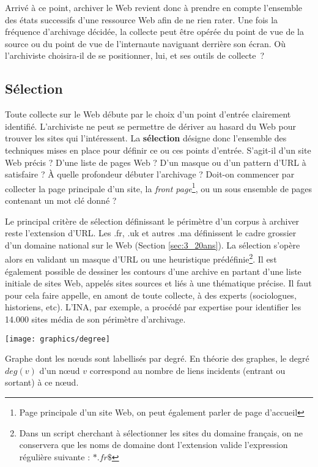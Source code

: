 \documentclass[symmetric,justified,marginals=raggedouter]{tufte-book}
\begin{document}
Arrivé à ce point, archiver le Web revient donc à prendre en compte l'ensemble des états successifs d'une ressource Web afin de ne rien rater. Une fois la fréquence d'archivage décidée, la collecte peut être opérée du point de vue de la source ou du point de vue de l'internaute naviguant derrière son écran. Où l'archiviste choisira-il de se positionner, lui, et ses outils de collecte~?

\subsection{Sélection}

\noindent Toute collecte sur le Web débute par le choix d'un point d'entrée clairement identifié. L'archiviste ne peut se permettre de dériver au hasard du Web pour trouver les sites qui l'intéressent. La \textbf{sélection} désigne donc l'ensemble des techniques mises en place pour définir ce ou ces points d'entrée. S'agit-il d'un site Web précis ? D'une liste de pages Web ? D'un masque ou d'un pattern d'URL à satisfaire ? À quelle profondeur débuter l'archivage ? Doit-on commencer par collecter la page principale d'un site, la \textit{front page}\footnote{Page principale d'un site Web, on peut également parler de page d'accueil}, ou un sous ensemble de pages contenant un mot clé donné ?     

Le principal critère de sélection définissant le périmètre d'un corpus à archiver reste l'extension d'URL. Les .fr, .uk et autres .ma définissent le cadre grossier d'un domaine national sur le Web (Section \ref{sec:3_20ans}). La sélection s'opère alors en validant un masque d'URL ou une heuristique prédéfinie\footnote{Dans un script cherchant à sélectionner les sites du domaine français, on ne conservera que les noms de domaine dont l'extension valide l'expression régulière suivante : $*.fr\$$}. Il est également possible de dessiner les contours d'une archive en partant d'une liste initiale de sites Web, appelés sites sources et liés à une thématique précise. Il faut pour cela faire appelle, en amont de toute collecte, à des experts (sociologues, historiens, etc). L'INA, par exemple, a procédé par expertise pour identifier les 14.000 sites média de son périmètre d'archivage. 

\begin{marginfigure}%
  \texttt{[image: graphics/degree]}
  \caption{Graphe dont les nœuds sont labellisés par degré. En théorie des graphes, le degré $deg(v)$ d'un nœud $v$ correspond au nombre de liens incidents (entrant ou sortant) à ce nœud.}
  \label{fig:degree}
\end{marginfigure} 
\end{document}
